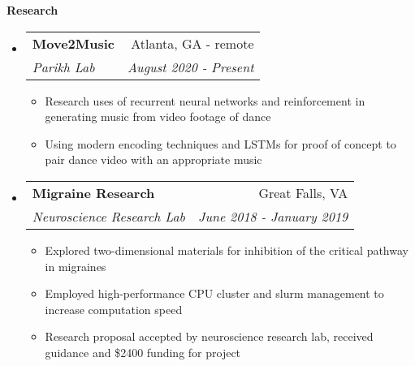 \documentclass[letterpaper,10pt]{article}
\makeatletter
\newcommand{\resitem}[1]{\item #1 \vspace{-3.5pt}}
\newcommand{\resheading}[1]{{\large \colorbox{mygrey}{\begin{minipage}{\textwidth}{\textbf{#1 \vphantom{p\^{E}}}}\end{minipage}}}}
\newcommand{\ressubheading}[4]{
\begin{tabular*}{7.0in}{l@{\extracolsep{\fill}}r}
		\textbf{#1} & #2 \\
		\textit{#3} & \textit{#4} \\
\end{tabular*}\vspace{-6pt}}
\makeatother
\begin{document}

\resheading{Research}
\begin{itemize}
\item
    \ressubheading{Move2Music}{Atlanta, GA - remote}{Parikh Lab}{August 2020 - Present}
    \begin{itemize}
        \resitem{Research uses of recurrent neural networks and reinforcement in generating music from video footage of dance}
        \resitem{Using modern encoding techniques and LSTMs for proof of concept to pair dance video with an appropriate music}
    \end{itemize}
\item
	\ressubheading{Migraine Research}{Great Falls, VA}{Neuroscience Research Lab}{June 2018 - January 2019}
	\begin{itemize}
		\resitem{Explored two-dimensional materials for inhibition of the critical pathway in migraines}
	    \resitem{Employed high-performance CPU cluster and slurm management to increase computation speed}
	    \resitem{Research proposal accepted by neuroscience research lab, received guidance and \$2400 funding for project}
	\end{itemize}
	
\end{itemize}
\end{document}
